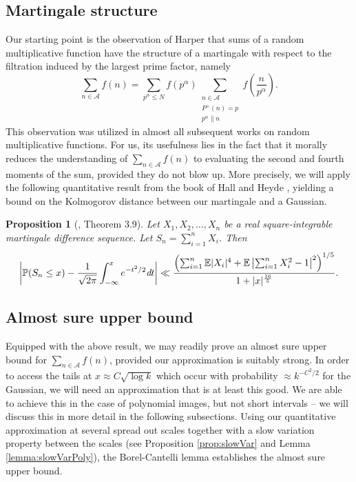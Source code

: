 \documentclass[11pt]{tran-l}
\newtheorem{prop}[theorem]{Proposition}
\theoremstyle{definition}
\theoremstyle{remark}
\numberwithin{equation}{section}
\begin{document}
\subsection{Martingale structure} Our starting point is the observation of Harper \cite{Harper2013} that sums of a random multiplicative function have the structure of a martingale with respect to the filtration induced by the largest prime factor, namely 
\begin{equation*}
    \sum_{n\in\mathcal A}f(n) = \sum_{p^{\alpha}\leq N}f(p^{\alpha})\sum_{\substack{n\in\mathcal A \\ P^+(n)=p \\ p^{\alpha}\parallel n}}f\left(\frac{n}{p^{\alpha}}\right).
\end{equation*}
This observation was utilized in almost all subsequent works on random multiplicative functions. For us, its usefulness lies in the fact that it morally reduces the understanding of $\sum_{n\in\mathcal A}f(n)$ to evaluating the second and fourth moments of the sum, provided they do not blow up. More precisely, we will apply the following quantitative result from the book of Hall and Heyde \cite{HallHeyde1980}, yielding a bound on the Kolmogorov distance between our martingale and a Gaussian. 
\begin{prop}[\cite{HallHeyde1980}, Theorem 3.9]\label{prop:quantCLT}
    Let $X_1, X_2, \ldots, X_n$ be a real square-integrable martingale difference sequence.
    Let $S_n = \sum_{i=1}^n X_i$. Then 
    \begin{equation*}
\left\lvert\mathbb P(S_n\leq x) - \frac{1}{\sqrt{2\pi}}\int_{-\infty}^x e^{-t^2/2}\emph{d}t\right\rvert\ll \frac{\left(\sum_{i=1}^n \mathbb E\lvert X_i\rvert^4 + \mathbb E\left\lvert\sum_{i=1}^n X_i^2 - 1\right\rvert^2\right)^{1/5}}{1+\lvert x\rvert^{\frac{16}{5}}}.
    \end{equation*}
\end{prop}
\subsection{Almost sure upper bound} Equipped with the above result, we may readily prove an almost sure upper bound for $\sum_{n\in\mathcal A} f(n)$, provided our approximation is suitably strong. In order to access the tails at $x\approx C\sqrt{\log k}$ which occur with probability $\approx k^{-C^2/2}$ for the Gaussian, we will need an approximation that is at least this good. We are able to achieve this in the case of polynomial images, but not short intervals -- we will discuss this in more detail in the following subsections. Using our quantitative approximation at several spread out scales together with a slow variation property between the scales (see Proposition \ref{prop:slowVar} and Lemma \ref{lemma:slowVarPoly}), the Borel-Cantelli lemma establishes the almost sure upper bound. 
\end{document}
